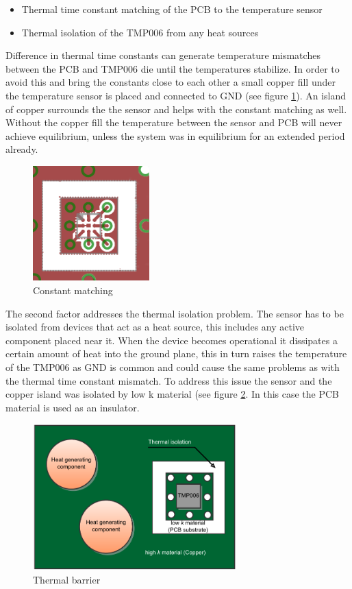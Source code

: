 \begin{itemize}
\item Thermal time constant matching of the PCB to the temperature sensor
\item Thermal isolation of the TMP006 from any heat sources
\end{itemize}

Difference in thermal time constants can generate temperature mismatches between the PCB and TMP006 die until the temperatures stabilize. In order to avoid this and bring the constants close to each other a small copper fill under the temperature sensor is placed and connected to GND (see figure \ref{fig:constant_matching}). An island of copper surrounds the the sensor and helps with the constant matching as well. Without the copper fill the temperature between the sensor and PCB will never achieve equilibrium, unless the system was in equilibrium for an extended period already. 

\begin{figure}
\centering
\includegraphics[width=0.4\textwidth]{Images/constant_matching}
\caption{Constant matching}
\label{fig:constant_matching}
\end{figure}

The second factor addresses the thermal isolation problem. The sensor has to be isolated from devices that act as a heat source, this includes any active component placed near it. When the device becomes operational it dissipates a certain amount of heat into the ground plane, this in turn raises the temperature of the TMP006 as GND is common and could cause the same problems as with the thermal time constant mismatch. To address this issue the sensor and the copper island was isolated by low k material (see figure \ref{fig:thermal_barrier}. In this case the PCB material is used as an insulator.

\begin{figure}
\centering
\includegraphics[width=0.7\textwidth]{Images/temp_barrier}
\caption{Thermal barrier}
\label{fig:thermal_barrier}
\end{figure}

